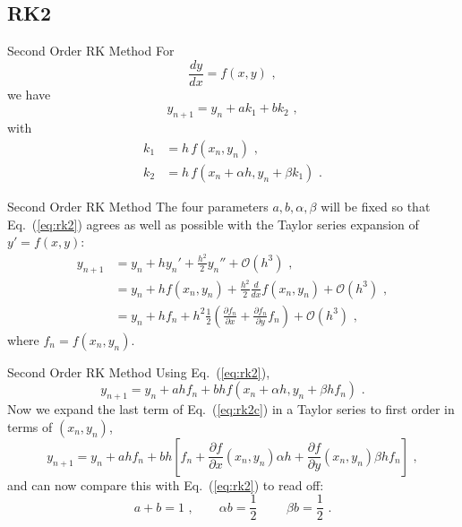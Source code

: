 \documentclass[11pt]{beamer}
\begin{document}
\subsection{RK2}
\begin{frame}[fragile]{Second Order RK Method}
 For
\begin{equation}
\frac{dy}{dx} = f(x,y)\,\,,
\end{equation}
we have 
\begin{equation}
\label{eq:rk2}
y_{n+1} = y_n + a k_1 + b k_2\,\,,
\end{equation}
with
\begin{align}
k_1 &= h\,f(x_n,y_n)\,\,,\nonumber\\
k_2 &= h\,f(x_n+\alpha h,y_n + \beta k_1)\,\,.
\end{align}
\end{frame}

\begin{frame}[fragile]{Second Order RK Method}
The four parameters $a,b,\alpha,\beta$ will be fixed so that
Eq.~(\ref{eq:rk2}) agrees as well as possible with the Taylor series expansion
of $y' = f(x,y)$:
\begin{align}
y_{n+1} &= y_n + h y_n' + \frac{h^2}{2} y_n'' + \mathcal{O}(h^3)\,\,,\nonumber\\
&= y_n + h f(x_n,y_n) + \frac{h^2}{2} \frac{d}{dx} f(x_n,y_n) + \mathcal{O}(h^3)\,\,,\nonumber\\
&= y_n + h f_n + h^2 \frac{1}{2}\left( \frac{\partial f_n}{\partial x} + \frac{\partial f_n}{\partial y} f_n \right) + \mathcal{O}(h^3)\,\,,
\end{align}
where $f_n = f(x_n,y_n)$.
\end{frame}

\begin{frame}[fragile]{Second Order RK Method}
Using Eq.~(\ref{eq:rk2}),
\begin{equation}
y_{n+1} = y_n + a h f_n + b h f(x_n + \alpha h, y_n + \beta h f_n)\,\,.
\label{eq:rk2c}
\end{equation}
Now we expand the last term of Eq.~(\ref{eq:rk2c}) in a Taylor
series to first order in terms of $(x_n,y_n)$,
\begin{equation}
y_{n+1} = y_n + a h f_n + bh\left[ f_n + \frac{\partial f}{\partial x}(x_n,y_n) \alpha h + 
\frac{\partial f}{\partial y}(x_n,y_n) \beta h f_n \right]\,\,,
\end{equation}
and can now compare this with Eq.~(\ref{eq:rk2}) to read off:
\begin{equation}
a+b = 1\,\,,\hspace{2em} \alpha b = \frac{1}{2}\,\,\hspace{2em} \beta b = \frac{1}{2}\,\,.
\end{equation}
\end{frame}
\end{document}
